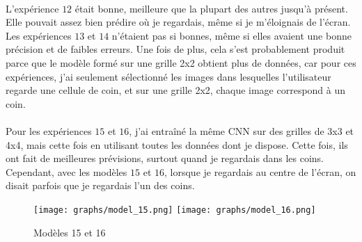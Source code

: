 \paragraph{}
L'expérience $12$ était bonne, meilleure que la plupart des autres jusqu'à présent.
Elle pouvait assez bien prédire où je regardais, même si je m'éloignais de l'écran.
Les expériences $13$ et $14$ n'étaient pas si bonnes, même si elles avaient une bonne précision et de faibles erreurs.
Une fois de plus, cela s'est probablement produit parce que le modèle formé sur une grille 2x2 obtient plus de données, car pour ces expériences, j'ai seulement sélectionné les images dans lesquelles l'utilisateur regarde une cellule de coin, et sur une grille 2x2, chaque image correspond à un coin.

\paragraph{}
Pour les expériences $15$ et $16$, j'ai entraîné la même CNN sur des grilles de 3x3 et 4x4, mais cette fois en utilisant toutes les données dont je dispose.
Cette fois, ils ont fait de meilleures prévisions, surtout quand je regardais dans les coins.
Cependant, avec les modèles $15$ et $16$, lorsque je regardais au centre de l'écran, on disait parfois que je regardais l'un des coins.


\begin{figure}[H]
    \centering
    \texttt{[image: graphs/model\_15.png]}
    \texttt{[image: graphs/model\_16.png]}
    \caption{Modèles 15 et 16}
\end{figure}

